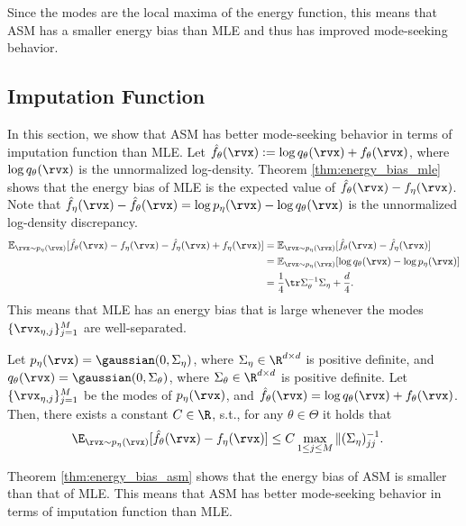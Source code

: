\documentclass{article} %
\begin{document}
Since the modes are the local maxima of the energy function, this means that ASM has a smaller energy bias than MLE and thus has improved mode-seeking behavior.

\subsection{Imputation Function}
\label{sec:imputation}
In this section, we show that ASM has better mode-seeking behavior in terms of imputation function than MLE. Let $\hat{f}_{\theta}(\rvx) := \log q_{\theta}(\rvx) + f_{\theta}(\rvx)$, where $\log q_{\theta}(\rvx)$ is the unnormalized log-density. Theorem \ref{thm:energy_bias_mle} shows that the energy bias of MLE is the expected value of $\hat{f}_{\theta}(\rvx) - f_{\eta}(\rvx)$. Note that $\hat{f}_{\eta}(\rvx) - \hat{f}_{\theta}(\rvx) = \log p_{\eta}(\rvx) - \log q_{\theta}(\rvx)$ is the unnormalized log-density discrepancy.
\begin{align*}
	\mathbb{E}_{\rvx \sim p_{\eta}(\rvx)}[ \hat{f}_{\theta}(\rvx) - f_{\eta}(\rvx) - \hat{f}_{\eta}(\rvx) + f_{\eta}(\rvx) ] &= \mathbb{E}_{\rvx \sim p_{\eta}(\rvx)}[ \hat{f}_{\theta}(\rvx) - \hat{f}_{\eta}(\rvx) ] \\
	&= \mathbb{E}_{\rvx \sim p_{\eta}(\rvx)}[ \log q_{\theta}(\rvx) - \log p_{\eta}(\rvx) ] \\
	&= \frac{1}{4} \tr \Sigma_{\theta}^{-1} \Sigma_{\eta} + \frac{d}{4}.
\end{align*}
This means that MLE has an energy bias that is large whenever the modes $\{\rvx_{\eta, j}\}_{j=1}^{M}$ are well-separated.
\begin{theorem}%
	\label{thm:energy_bias_mle}
	 Let $p_{\eta}(\rvx) = \gaussian(0, \Sigma_{\eta})$, where $\Sigma_{\eta} \in \R^{d \times d}$ is positive definite, and $q_{\theta}(\rvx) = \gaussian(0, \Sigma_{\theta})$, where $\Sigma_{\theta} \in \R^{d \times d}$ is positive definite. Let $\{\rvx_{\eta, j}\}_{j=1}^{M}$ be the modes of $p_{\eta}(\rvx)$, and $\hat{f}_{\theta}(\rvx) = \log q_{\theta}(\rvx) + f_{\theta}(\rvx)$. Then, there exists a constant $C \in \R$, s.t., for any $\theta \in \Theta$ it holds that
	\begin{align*}
		\E_{\rvx \sim p_{\eta}(\rvx)}[\hat{f}_{\theta}(\rvx) - f_{\eta}(\rvx)] &\leq C \max_{1 \leq j \leq M} \|(\Sigma_{\eta})^{-1}_{jj}.
	\end{align*}
\end{theorem}
Theorem \ref{thm:energy_bias_asm} shows that the energy bias of ASM is smaller than that of MLE. This means that ASM has better mode-seeking behavior in terms of imputation function than MLE.
\end{document}
